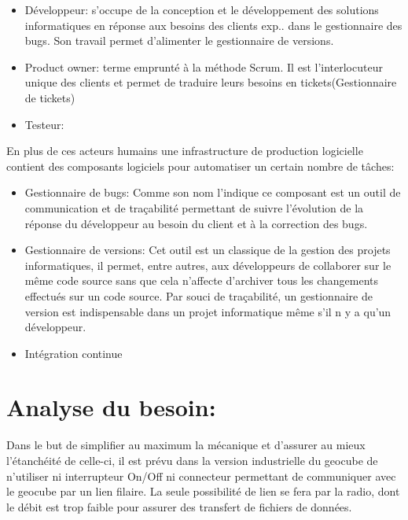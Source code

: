 \documentclass{themeensg}
\begin{document}
\begin{itemize}
\item Développeur: s'occupe de la conception et le développement des solutions informatiques en réponse aux besoins des clients exp.. dans le gestionnaire des bugs. Son travail permet d'alimenter le gestionnaire de versions.
\item Product owner: terme emprunté à la méthode Scrum. Il est l'interlocuteur unique des clients et permet de traduire leurs besoins en tickets(Gestionnaire de tickets)
\item Testeur: 
\end{itemize}
En plus de ces acteurs humains une infrastructure de production logicielle contient des composants logiciels pour automatiser un certain nombre de tâches:
\begin{itemize}
\item Gestionnaire de bugs: Comme son nom l'indique ce composant est un outil de communication et de traçabilité permettant de suivre l'évolution de la réponse du développeur au besoin du client et à la correction des bugs.
\item Gestionnaire de versions: Cet outil est un classique de la gestion des projets informatiques, il permet, entre autres, aux développeurs de collaborer sur le même code source sans que cela n'affecte  d'archiver tous les changements effectués sur un code source. Par souci de traçabilité, un gestionnaire de version est indispensable dans un projet informatique même s'il n y a qu'un développeur.
\item Intégration continue
\end{itemize}



\section{Analyse du besoin:}
Dans le but de simplifier au maximum la mécanique et d’assurer au mieux l’étanchéité de celle-ci, il est prévu dans la version industrielle du geocube de n’utiliser ni interrupteur On/Off ni connecteur permettant de communiquer avec le geocube par un lien filaire. La seule possibilité de lien se fera par la radio, dont le débit est trop faible pour assurer des transfert de fichiers de données.
\end{document}
